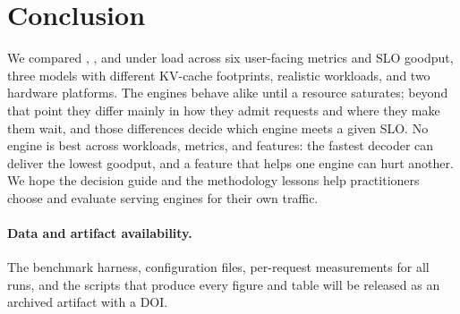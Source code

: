 \section{Conclusion}
\label{sec:conclusion}

We compared \vllm, \sglang, and \trt under load across six user-facing metrics and SLO goodput,
three models with different KV-cache footprints, realistic workloads, and two hardware platforms.
The engines behave alike until a resource saturates; beyond that point they differ mainly in how
they admit requests and where they make them wait, and those differences decide which engine
meets a given SLO. No engine is best across workloads, metrics, and features: the fastest decoder
can deliver the lowest goodput, and a feature that helps one engine can hurt another. We hope the
decision guide and the methodology lessons help practitioners choose and evaluate serving engines
for their own traffic. 

\paragraph{Data and artifact availability.}
The benchmark harness, configuration files, per-request measurements for all runs, and the
scripts that produce every figure and table will be released as an archived artifact with a DOI.
